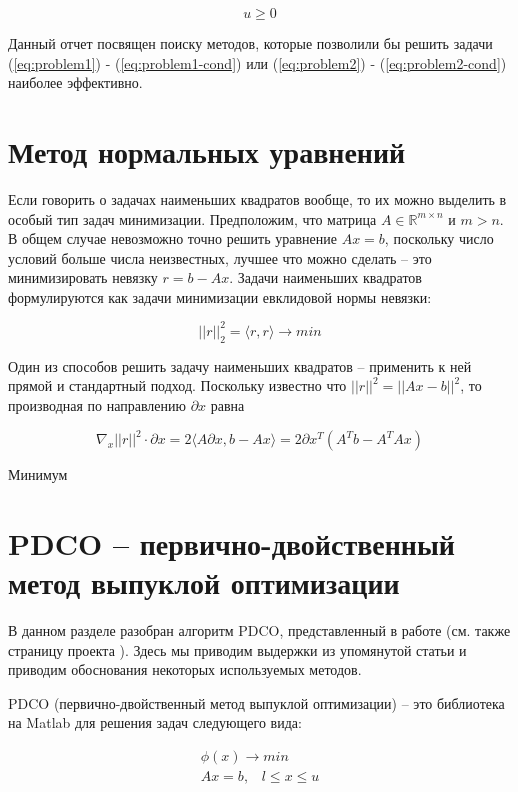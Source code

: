 \documentclass[a4paper, 12pt, titlepage]{article}
\theoremstyle{definition}
\theoremstyle{plain}
\theoremstyle{plain}
\begin{document}
\begin{equation}
 u \geq 0
\end{equation}

Данный отчет посвящен поиску методов, которые позволили бы решить задачи
(\ref{eq:problem1}) - (\ref{eq:problem1-cond}) или (\ref{eq:problem2}) -
(\ref{eq:problem2-cond}) наиболее эффективно.

\section{Метод нормальных уравнений}

Если говорить о задачах наименьших квадратов вообще, то их можно выделить в
особый тип задач минимизации. Предположим, что матрица $A \in \mathbb{R}^{m
\times n}$ и $m > n$. В общем случае невозможно точно решить уравнение
$A x = b$, поскольку число условий больше числа неизвестных, лучшее что можно
сделать -- это минимизировать невязку $r = b - A x$. Задачи наименьших
квадратов формулируются как задачи минимизации евклидовой нормы невязки:

$$
||r||^{2}_{2} = \langle r, r \rangle \to min
$$

Один из способов решить задачу наименьших квадратов -- применить к ней прямой
и стандартный подход. Поскольку известно что $||r||^{2} = ||A x - b||^{2}$, то
производная по направлению $\partial x$ равна

$$
\nabla_{x} ||r||^{2} \cdot \partial x = 2 \langle A \partial x, b - A x\rangle =
2 \partial x^{T} (A^{T} b - A^{T} A x)
$$

Минимум

\section{PDCO -- первично-двойственный метод выпуклой оптимизации}

В данном разделе разобран алгоритм PDCO, представленный в работе
\cite{Saunders2013} (см. также страницу проекта \cite{PDCO}). Здесь мы приводим
выдержки из упомянутой статьи и приводим обоснования некоторых используемых 
методов.

PDCO (первично-двойственный метод выпуклой оптимизации) -- это библиотека на 
Matlab  для решения задач следующего вида:

\begin{equation}
 \begin{aligned}
 \phi(x) \to min \\
 Ax = b, \;\;\; l \leq x \leq u \\
 \end{aligned}
\end{equation}
\end{document}
